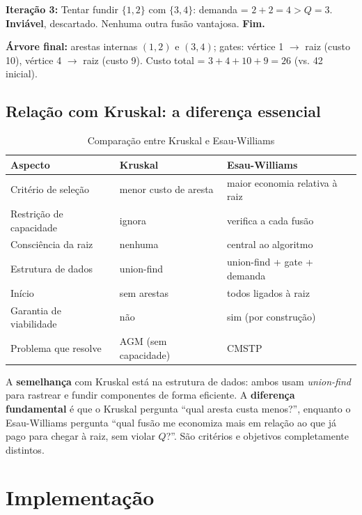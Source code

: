 \documentclass[12pt, a4paper]{article}
\begin{document}
\textbf{Iteração 3:} Tentar fundir $\{1,2\}$ com $\{3,4\}$: demanda = $2+2=4 > Q=3$. \textbf{Inviável}, descartado. Nenhuma outra fusão vantajosa. \textbf{Fim.}

\textbf{Árvore final:} arestas internas $(1,2)$ e $(3,4)$; gates: vértice 1 $\to$ raiz (custo 10), vértice 4 $\to$ raiz (custo 9). Custo total = $3 + 4 + 10 + 9 = 26$ (vs. 42 inicial).

\subsection{Relação com Kruskal: a diferença essencial}

\begin{table}[H]
\centering
\caption{Comparação entre Kruskal e Esau-Williams}
\begin{tabular}{lll}
\toprule
\textbf{Aspecto} & \textbf{Kruskal} & \textbf{Esau-Williams} \\
\midrule
Critério de seleção & menor custo de aresta & maior economia relativa à raiz \\
Restrição de capacidade & ignora & verifica a cada fusão \\
Consciência da raiz & nenhuma & central ao algoritmo \\
Estrutura de dados & union-find & union-find + gate + demanda \\
Início & sem arestas & todos ligados à raiz \\
Garantia de viabilidade & não & sim (por construção) \\
Problema que resolve & AGM (sem capacidade) & CMSTP \\
\bottomrule
\end{tabular}
\end{table}

A \textbf{semelhança} com Kruskal está na estrutura de dados: ambos usam \textit{union-find} para rastrear e fundir componentes de forma eficiente. A \textbf{diferença fundamental} é que o Kruskal pergunta ``qual aresta custa menos?'', enquanto o Esau-Williams pergunta ``qual fusão me economiza mais em relação ao que já pago para chegar à raiz, sem violar $Q$?''. São critérios e objetivos completamente distintos.

\section{Implementação}
\end{document}
